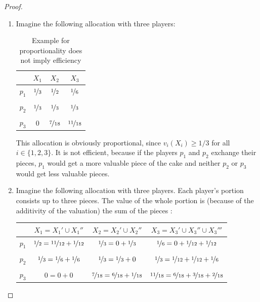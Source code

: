\begin{proof}
\textcolor{white}{x}
	\begin{enumerate}
		\item Imagine the following allocation with three players:
		\begin{table}[htb]
		\centering
		\renewcommand{\arraystretch}{1.2}
		\begin{tabular}{c|ccc}
		& $X_1$& $X_2$& $X_3$\\
		\hline
		$p_1$ & \textcolor{blue}{$\nicefrac{1}{3}$} & $\nicefrac{1}{2}$ & $\nicefrac{1}{6}$\\ \\
  $p_2$ & $\nicefrac{1}{3}$ & \textcolor{blue}{$\nicefrac{1}{3}$} & $\nicefrac{1}{3}$\\ \\
  $p_3$ & $0$ & $\nicefrac{7}{18}$ & \textcolor{blue}{$\nicefrac{11}{18}$}
 		\end{tabular}
\caption{Example for proportionality does not imply efficiency}\label{Table2}
\end{table}
\newline	 
This allocation is obviously proportional, since $v_i(X_i) \geq 1/3$ for all $i \in \{1,2,3\}$. It is not efficient, because if the players $p_1$ and $p_2$ exchange their pieces, $p_1$ would get a more valuable piece of the cake and neither $p_2$ or $p_3$ would get less valuable pieces.
\item Imagine the following allocation with three players. Each player's portion consists up to three pieces. The value of the whole portion is (because of the additivity of the valuation) the sum of the pieces :
		\begin{table}[htb]
		\centering
		\renewcommand{\arraystretch}{1.2}
		\begin{tabular}{c|ccc}
		& $X_1 =X_1'\cup X_1''$& $X_2 =X_2'\cup X_2''$& $X_3 =X_3'\cup X_3''\cup X_3'''$\\
		\hline
		$p_1$ & \textcolor{blue}{$\nicefrac{1}{2}=\nicefrac{11}{12}+\nicefrac{1}{12}$} & $\nicefrac{1}{3}=0+\nicefrac{1}{3}$ & $\nicefrac{1}{6}=0+\nicefrac{1}{12}+\nicefrac{1}{12}$\\ \\
  $p_2$ & $\nicefrac{1}{3}=\nicefrac{1}{6}+\nicefrac{1}{6}$ & \textcolor{blue}{$\nicefrac{1}{3}=\nicefrac{1}{3}+0$} & $\nicefrac{1}{3}=\nicefrac{1}{12}+\nicefrac{1}{12}+\nicefrac{1}{6}$\\ \\
  $p_3$ & $0=0+0$ & $\nicefrac{7}{18}=\nicefrac{6}{18}+\nicefrac{1}{18}$ & \textcolor{blue}{$\nicefrac{11}{18}=\nicefrac{6}{18}+\nicefrac{3}{18}+\nicefrac{2}{18}$}

\end{tabular}
\end{table}
\end{enumerate}
\end{proof}
